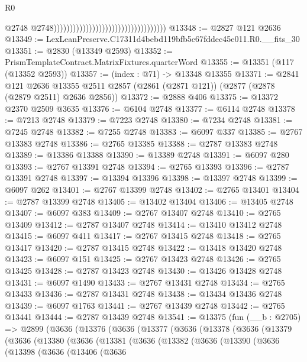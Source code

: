 \begin{lexlean}{R0}
\begin{coremodule}
                                                                          @2748
                                                                          @2748)))))))))))))))))))))))))))))))))))
@13348 := @2827 @121 @2636
@13349 := LexLeanPreserve.C17311d4bebd119bfb5c67fddec45e011.R0.__fits_30
@13351 := @2830 (@13349 @2593)
@13352 := PrismTemplateContract.MatrixFixtures.quarterWord
@13355 := @13351 (@117 (@13352 @2593))
@13357 := (index : @71) -> @13348 @13355
@13371 := @2841
    @121
    @2636
    @13355
    @2511
    @2857
    (@2861 (@2871 @121))
    (@2877 (@2878 (@2879 @2511) @2636 @2856))
@13372 := @2888 @406
@13375 := @13372 @2370 @2509 @3635
@13376 := @6104 @2748
@13377 := @6114 @2748
@13378 := @7213 @2748
@13379 := @7223 @2748
@13380 := @7234 @2748
@13381 := @7245 @2748
@13382 := @7255 @2748
@13383 := @6097 @337
@13385 := @2767 @13383 @2748
@13386 := @2765 @13385
@13388 := @2787 @13383 @2748
@13389 := @13386 @13388
@13390 := @13389 @2748
@13391 := @6097 @280
@13393 := @2767 @13391 @2748
@13394 := @2765 @13393
@13396 := @2787 @13391 @2748
@13397 := @13394 @13396
@13398 := @13397 @2748
@13399 := @6097 @262
@13401 := @2767 @13399 @2748
@13402 := @2765 @13401
@13404 := @2787 @13399 @2748
@13405 := @13402 @13404
@13406 := @13405 @2748
@13407 := @6097 @383
@13409 := @2767 @13407 @2748
@13410 := @2765 @13409
@13412 := @2787 @13407 @2748
@13414 := @13410 @13412 @2748
@13415 := @6097 @411
@13417 := @2767 @13415 @2748
@13418 := @2765 @13417
@13420 := @2787 @13415 @2748
@13422 := @13418 @13420 @2748
@13423 := @6097 @151
@13425 := @2767 @13423 @2748
@13426 := @2765 @13425
@13428 := @2787 @13423 @2748
@13430 := @13426 @13428 @2748
@13431 := @6097 @1490
@13433 := @2767 @13431 @2748
@13434 := @2765 @13433
@13436 := @2787 @13431 @2748
@13438 := @13434 @13436 @2748
@13439 := @6097 @1763
@13441 := @2767 @13439 @2748
@13442 := @2765 @13441
@13444 := @2787 @13439 @2748
@13541 := @13375
    (fun (__b : @2705) =>
    @2899
      (@3636
        (@13376
          (@3636
            (@13377
              (@3636
                (@13378
                  (@3636
                    (@13379
                      (@3636
                        (@13380
                          (@3636
                            (@13381
                              (@3636
                                (@13382
                                  (@3636
                                    (@13390
                                      (@3636
                                        (@13398
                                          (@3636
                                            (@13406
                                              (@3636

\end{coremodule}
\end{lexlean}
